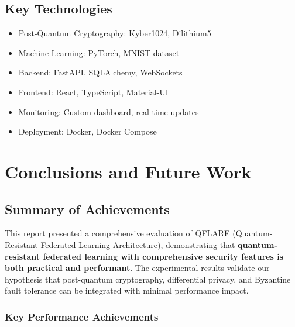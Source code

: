 \documentclass[12pt,a4paper]{article}
\begin{document}
\subsection{Key Technologies}

\begin{itemize}
    \item Post-Quantum Cryptography: Kyber1024, Dilithium5
    \item Machine Learning: PyTorch, MNIST dataset
    \item Backend: FastAPI, SQLAlchemy, WebSockets
    \item Frontend: React, TypeScript, Material-UI
    \item Monitoring: Custom dashboard, real-time updates
    \item Deployment: Docker, Docker Compose
\end{itemize}

\section{Conclusions and Future Work}

\subsection{Summary of Achievements}

This report presented a comprehensive evaluation of QFLARE (Quantum-Resistant Federated Learning Architecture), demonstrating that \textbf{quantum-resistant federated learning with comprehensive security features is both practical and performant}. The experimental results validate our hypothesis that post-quantum cryptography, differential privacy, and Byzantine fault tolerance can be integrated with minimal performance impact.

\subsubsection{Key Performance Achievements}
\end{document}

